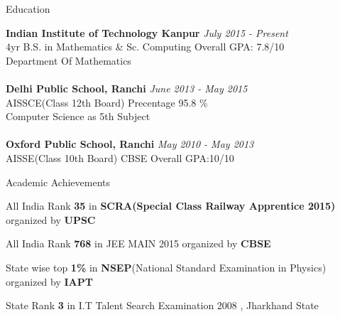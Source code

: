 \documentclass{resume} %
\begin{document}

\begin{rSection}{ \hspace{.5cm} Education}

{\bf Indian Institute of Technology Kanpur} \hfill {\em July 2015 - Present} 
\\ 4yr B.S. in Mathematics \& Sc. Computing \hfill { Overall GPA: 7.8/10}
\\ Department Of Mathematics\\ \\
{\bf Delhi Public School, Ranchi} \hfill {\em June 2013 - May 2015} 
\\ AISSCE(Class 12th Board) \hfill { Precentage 95.8 \%}
\\ Computer Science as 5th Subject\\ \\
{\bf Oxford Public School, Ranchi} \hfill {\em May 2010 - May 2013} 
\\ AISSE(Class 10th Board) CBSE \hfill { Overall GPA:10/10}
 



\begin{rSection}{Academic Achievements} \itemsep -2pt
\item \textbullet All India Rank \textbf{35} in \textbf{SCRA(Special Class Railway Apprentice 2015)}  organized by \textbf{UPSC}
\item  \textbullet All India Rank \textbf{768} in JEE MAIN 2015 organized by \textbf{CBSE}
\item  \textbullet State wise top \textbf{1\% } in \textbf{NSEP}(National Standard Examination in Physics) organized by \textbf{IAPT} 
\item  \textbullet State Rank \textbf{3} in I.T Talent Search Examination 2008 , Jharkhand State 
\end{rSection}



\end{rSection}
\end{document}
